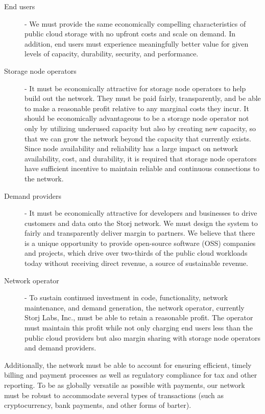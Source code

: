 \documentclass[8pt,fleqn,openany]{book}
\begin{document}
\begin{description}
\item[End users] - We must provide the same economically compelling
  characteristics of public cloud storage with no upfront costs and scale on
  demand.
  In addition, end users must experience meaningfully better value for given
  levels of capacity, durability, security, and performance.

\item[Storage node operators] - It must be economically attractive for storage
  node operators to help build out the network.
  They must be paid fairly, transparently, and be able to make a
  reasonable profit relative to any marginal costs they incur.
  It should be economically advantageous to be a storage
  node operator not only by utilizing underused capacity but also by creating
  new capacity, so that we can grow the network beyond the capacity that
  currently exists.
  Since node availability and reliability has a large impact on network
  availability, cost, and durability, it is required that storage node
  operators have sufficient incentive to maintain reliable and continuous
  connections to the network.

\item[Demand providers] - It must be economically attractive for developers and
  businesses to drive customers and data onto the Storj network. We must design
  the system to fairly and transparently deliver margin to partners. We believe
  that there is a unique opportunity to provide open-source software (OSS)
  companies and projects, which drive over two-thirds of the public cloud workloads
  today without receiving direct revenue, a source of sustainable revenue.

\item[Network operator] - To sustain continued investment in code,
functionality, network maintenance, and demand generation, the network
operator, currently Storj Labs, Inc.,  must be able to retain a reasonable profit. The operator must maintain this profit while
not only charging end users less than the public cloud providers but also margin sharing
with storage node operators and demand providers.
\end{description}

Additionally, the network must be able to account for ensuring efficient, timely billing
and payment processes as well as regulatory compliance for tax and other reporting.
To be as globally versatile as possible with payments, our network must be robust to accommodate several types of transactions (such as cryptocurrency, bank payments, and other forms of barter).
\end{document}
